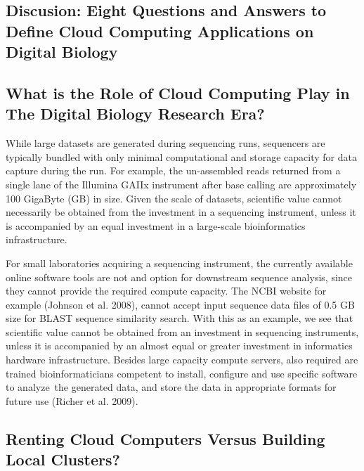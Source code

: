 \documentclass[10pt]{bmc_article}
\newenvironment{bmcformat}{\begin{raggedright}\baselineskip20pt\sloppy\setboolean{publ}{false}}{\end{raggedright}\baselineskip20pt\sloppy}
\begin{document}
\begin{bmcformat}
 
\section*{Discusion: Eight Questions and Answers to Define Cloud Computing Applications on Digital Biology}\pb 

  \subsection*{What is the Role of Cloud Computing Play in The Digital Biology Research Era?}
  
      While large datasets are generated during sequencing runs, sequencers are typically bundled 
      with only minimal computational and storage capacity for data capture during the run. 
      For example, the un-assembled reads returned from a single lane of the Illumina GAIIx instrument 
      after base calling are approximately 100 GigaByte (GB) in size. Given the scale of datasets, 
      scientific value cannot necessarily be obtained from the investment in a sequencing instrument,
      unless it is accompanied by an equal investment in a large-scale bioinformatics infrastructure. \pb

      For small laboratories acquiring a sequencing instrument, the currently available online
      software tools are not and option for downstream sequence analysis, since they cannot
      provide the required compute capacity. The NCBI website for example (Johnson et al. 2008),
      cannot accept input sequence data files of 0.5 GB size for BLAST sequence similarity
      search. With this as an example, we see that scientific value cannot be obtained from an
      investment in sequencing instruments, unless it is accompanied by an almost equal or
      greater investment in informatics hardware infrastructure. Besides large capacity compute
      servers, also required are trained bioinformaticians competent to install, configure and
      use specific software to analyze the generated data, and store the data in appropriate
      formats for future use (Richer et al. 2009). \pb

  \subsection*{Renting Cloud Computers Versus Building Local Clusters?}


\end{bmcformat}
\end{document}

